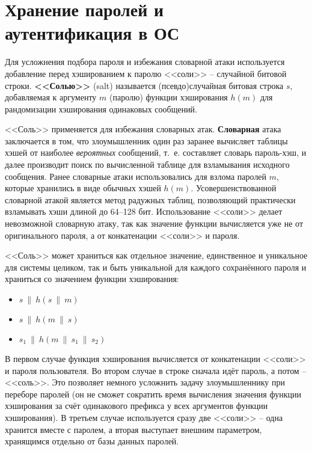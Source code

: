 \section[Хранение паролей и аутентификация в ОС]{Хранение паролей и \protect\\ аутентификация в ОС}

Для усложнения подбора пароля и избежания словарной атаки используется добавление перед хэшированием к паролю <<соли>> -- случайной битовой строки. \textbf{<<Солью>>} (salt) называется (псевдо)случайная битовая строка $s$, добавляемая к аргументу $m$ (паролю) функции хэширования $h(m)$ для рандомизации хэширования одинаковых сообщений.

<<Соль>> применяется для избежания словарных атак. \textbf{Словарная} атака заключается в том, что злоумышленник один раз заранее вычисляет таблицы хэшей от наиболее \emph{вероятных} сообщений, т.~е. составляет словарь пароль-хэш, и далее производит поиск по вычисленной таблице для взламывания исходного сообщения. Ранее словарные атаки использовались для взлома паролей $m$, которые хранились в виде обычных хэшей $h(m)$. Усовершенствованной словарной атакой является метод радужных таблиц, позволяющий практически взламывать хэши длиной до 64--128 бит. Использование <<соли>> делает невозможной словарную атаку, так как значение функции вычисляется уже не от оригинального пароля, а от конкатенации <<соли>> и пароля.

<<Соль>> может храниться как отдельное значение, единственное и уникальное для системы целиком, так и быть уникальной для каждого сохранённого пароля и храниться со значением функции хэширования:
\begin{itemize}
	\item $s ~\|~ h(s ~\|~ m)$
	\item $s ~\|~ h(m ~\|~ s)$
	\item $s_1 ~\|~ h(m ~\|~ s_1 ~\|~ s_2)$
\end{itemize}

В первом случае функция хэширования вычисляется от конкатенации <<соли>> и пароля пользователя. Во втором случае в строке сначала идёт пароль, а потом -- <<соль>>. Это позволяет немного усложнить задачу злоумышленнику при переборе паролей (он не сможет сократить время вычисления значения функции хэширования за счёт одинакового префикса у всех аргументов функции хэширования). В третьем случае используется сразу две <<соли>> -- одна хранится вместе с паролем, а вторая выступает внешним параметром, хранящимся отдельно от базы данных паролей.

